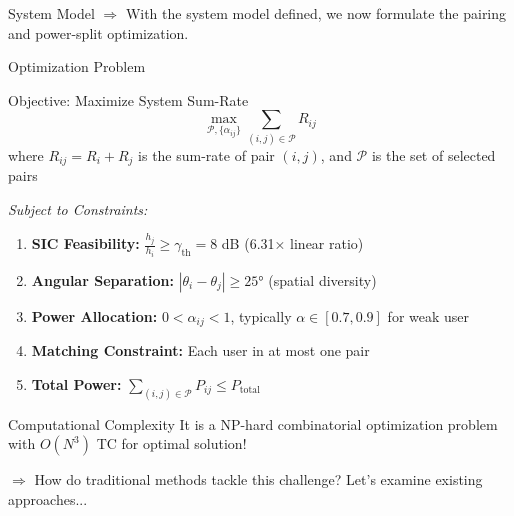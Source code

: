 \documentclass[aspectratio=169]{beamer}
\begin{document}
\begin{frame}{System Model}
  \vspace{0.25cm}
  \small $\Rightarrow$ With the system model defined, we now formulate the pairing and power-split optimization.
\end{frame}


\begin{frame}{Optimization Problem}
    \vspace{-0.2cm}
    
    
    \begin{block}{Objective: Maximize System Sum-Rate}
        \begin{equation*}
            \max_{\mathcal{P}, \{\alpha_{ij}\}} \sum_{(i,j) \in \mathcal{P}} R_{ij}
        \end{equation*}
        where $R_{ij} = R_i + R_j$ is the sum-rate of pair $(i,j)$, and $\mathcal{P}$ is the set of selected pairs
    \end{block}
    
    \textit{Subject to Constraints:}
    \begin{enumerate}
        \item \textbf{SIC Feasibility:} $\frac{h_j}{h_i} \geq \gamma_{\text{th}} = 8$ dB (6.31× linear ratio)
        
        \item \textbf{Angular Separation:} $|\theta_i - \theta_j| \geq 25°$ (spatial diversity)
        
        \item \textbf{Power Allocation:} $0 < \alpha_{ij} < 1$, typically $\alpha \in [0.7, 0.9]$ for weak user
        
        \item \textbf{Matching Constraint:} Each user in at most one pair
        
        \item \textbf{Total Power:} $\sum_{(i,j) \in \mathcal{P}} P_{ij} \leq P_{\text{total}}$
    \end{enumerate}
    
    \begin{alertblock}{Computational Complexity}
        It is a NP-hard combinatorial optimization problem with $O(N^3)$ TC for optimal solution!
    \end{alertblock}
    

    \small \textcolor{iiitblue}{$\Rightarrow$ How do traditional methods tackle this challenge? Let's examine existing approaches...}
\end{frame}

\end{document}
